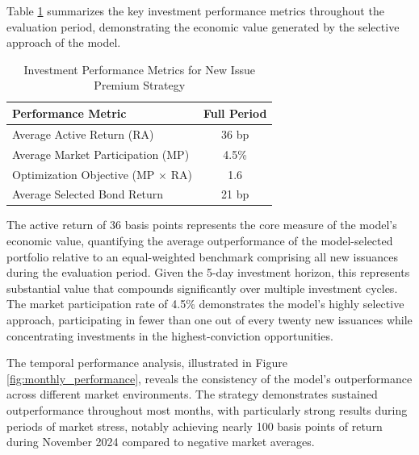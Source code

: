 Table \ref{tab:backtest_performance} summarizes the key investment performance metrics throughout the evaluation period, demonstrating the economic value generated by the selective approach of the model.

\begin{table}[htbp]
\centering
\caption{Investment Performance Metrics for New Issue Premium Strategy}
\label{tab:backtest_performance}
\begin{tabular}{lc}
\hline
\textbf{Performance Metric} & \textbf{Full Period} \\
\hline
Average Active Return (RA) & 36 bp \\
Average Market Participation (MP) & 4.5\% \\
Optimization Objective (MP $\times$ RA) & 1.6 \\
Average Selected Bond Return & 21 bp \\
\hline
\end{tabular}
\end{table}

The active return of 36 basis points represents the core measure of the model's economic value, quantifying the average outperformance of the model-selected portfolio relative to an equal-weighted benchmark comprising all new issuances during the evaluation period. Given the 5-day investment horizon, this represents substantial value that compounds significantly over multiple investment cycles. The market participation rate of 4.5\% demonstrates the model's highly selective approach, participating in fewer than one out of every twenty new issuances while concentrating investments in the highest-conviction opportunities.

The temporal performance analysis, illustrated in Figure \ref{fig:monthly_performance}, reveals the consistency of the model's outperformance across different market environments. The strategy demonstrates sustained outperformance throughout most months, with particularly strong results during periods of market stress, notably achieving nearly 100 basis points of return during November 2024 compared to negative market averages.


